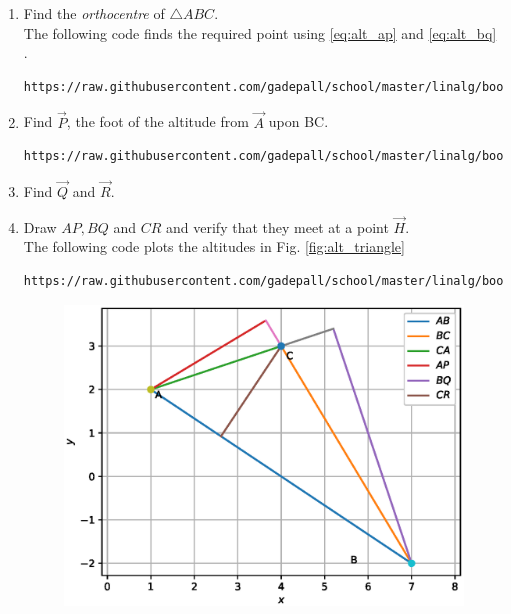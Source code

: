 \renewcommand{\theequation}{\theenumi}

\begin{enumerate}[label=\arabic*.,ref=\thesubsection.\theenumi]
\item
Find the {\em orthocentre} of  $\triangle ABC$.
\\
\solution The following code finds the required point using \eqref{eq:alt_ap} and \eqref{eq:alt_bq}
.
\begin{lstlisting}
https://raw.githubusercontent.com/gadepall/school/master/linalg/book/codes/orthocentre.py
\end{lstlisting}

\item Find $\vec{P}$, the foot of the altitude from $\vec{A}$ upon BC.
%
\\
\solution 
\begin{lstlisting}
https://raw.githubusercontent.com/gadepall/school/master/linalg/book/codes/alt_foot.py
\end{lstlisting}
\item Find $\vec{Q}$ and $\vec{R}$.
\item Draw $AP, BQ$ and $CR$ and verify that they meet at a point 
$\vec{H}$.  
\\
\solution The following code plots the altitudes in Fig. \ref{fig:alt_triangle}
\begin{lstlisting}
https://raw.githubusercontent.com/gadepall/school/master/linalg/book/codes/alt_draw.py
\end{lstlisting}
\begin{figure}
\centering
\includegraphics[width=\columnwidth]{./line/figs/alt_triangle.eps}

\end{figure}
\end{enumerate}
